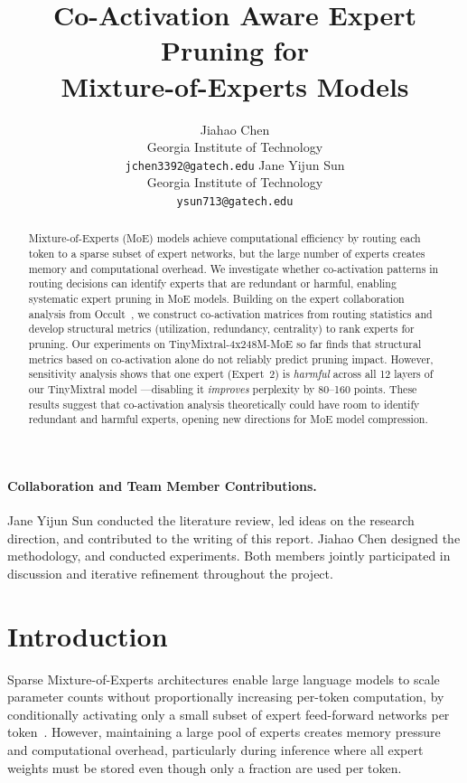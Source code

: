 \documentclass{article}
\title{Co-Activation Aware Expert Pruning for\\
Mixture-of-Experts Models}
\author{Jiahao Chen \\
Georgia Institute of Technology \\
\texttt{jchen3392@gatech.edu}
\And
Jane Yijun Sun \\
Georgia Institute of Technology \\
\texttt{ysun713@gatech.edu}
}
\begin{document}
\maketitle

\paragraph{Collaboration and Team Member Contributions.}
Jane Yijun Sun conducted the literature review, led ideas on the
research direction, and contributed to the writing of this report.
Jiahao Chen designed the methodology, and  conducted experiments.
Both members jointly participated in discussion and iterative refinement throughout
the project.

\begin{abstract}
Mixture-of-Experts (MoE) models achieve computational efficiency by routing each token
to a sparse subset of expert networks, but the large number of experts creates
memory and computational overhead.
We investigate whether co-activation patterns in routing decisions can identify experts that are redundant or harmful, enabling 
systematic expert pruning in MoE models.
Building on the expert collaboration analysis from Occult~\citep{luo2025occult},
we construct co-activation matrices from routing statistics and develop structural
metrics (utilization, redundancy, centrality) to rank experts for pruning.
Our experiments on TinyMixtral-4x248M-MoE so far finds that structural
metrics based on co-activation alone do not reliably predict pruning impact.
However, sensitivity analysis shows that one expert (Expert~2) is
\emph{harmful} across all 12 layers of our TinyMixtral model ---disabling it \emph{improves} perplexity by
80--160 points.
These results suggest that co-activation analysis theoretically could have room to identify redundant
and harmful experts, opening new directions for MoE model compression.
\end{abstract}

\section{Introduction}

Sparse Mixture-of-Experts architectures enable large language models to scale parameter
counts without proportionally increasing per-token computation, by conditionally
activating only a small subset of expert feed-forward networks per
token~\citep{shazeer2017outrageously,fedus2022switch}.
However, maintaining a large pool of experts creates memory pressure and computational
overhead, particularly during inference where all expert weights must be stored even
though only a fraction are used per token.
\end{document}
